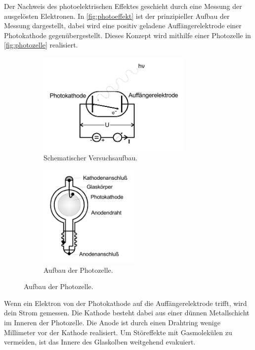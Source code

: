 Der Nachweis des photoelektrischen Effektes geschieht durch eine Messung der ausgelösten Elektronen.
In \autoref{fig:photoeffekt} ist der prinzipieller Aufbau der Messung dargestellt,
dabei wird eine positiv geladene Auffängerelektrode einer Photokathode gegenübergestellt.
Dieses Konzept wird mithilfe einer Photozelle in \autoref{fig:photozelle} realisiert.
\begin{figure}
    \begin{subfigure}{0.48\textwidth}
        \centering
        \includegraphics[height=5cm]{bilder/photoeffekt_schema.pdf}
        \caption{Schematischer Versuchsaufbau. \cite{v500}}
        \label{fig:photoeffekt}
    \end{subfigure}
    \hfill
    \begin{subfigure}{0.48\textwidth}
        \centering
        \includegraphics[height=5cm]{bilder/photozelle_aufbau.pdf}
        \caption{Aufbau der Photozelle. \cite{v500}}
        \label{fig:photozelle}
    \end{subfigure}
\end{figure}

Wenn ein Elektron von der Photokathode auf die Auffängerelektrode trifft, wird dein Strom gemessen.
Die Kathode besteht dabei aus einer dünnen Metallschicht im Inneren der Photozelle.
Die Anode ist durch einen Drahtring wenige Millimeter vor der Kathode realisiert. 
Um Störeffekte mit Gasmolekülen zu vermeiden, ist das Innere des Glaskolben weitgehend evakuiert.

